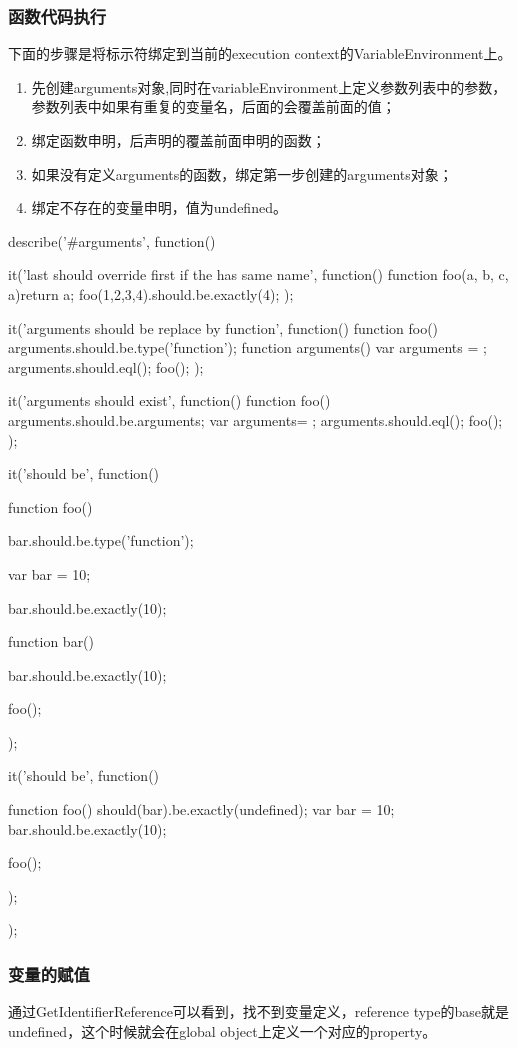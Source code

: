 \subsubsection{函数代码执行}
下面的步骤是将标示符绑定到当前的execution context的VariableEnvironment上。
\begin{enumerate}
\item 先创建arguments对象,同时在variableEnvironment上定义参数列表中的参数，参数列表中如果有重复的变量名，后面的会覆盖前面的值；
\item 绑定函数申明，后声明的覆盖前面申明的函数；
\item 如果没有定义arguments的函数，绑定第一步创建的arguments对象；
\item 绑定不存在的变量申明，值为undefined。
\end{enumerate}

\begin{JavaScript}
	describe('#arguments', function(){
		it('last should override first if the has same name', function(){
			function foo(a, b, c, a){return a;}
			foo(1,2,3,4).should.be.exactly(4);
		});

		it('arguments should be replace by function', function(){
			function foo(){
				arguments.should.be.type('function');
				function arguments(){}
				var arguments = {};
				arguments.should.eql({});
			}
			foo();
		});

		it('arguments should exist', function(){
			function foo(){
				arguments.should.be.arguments;
				var arguments= {};
				arguments.should.eql({});
			}
			foo();
		});

		it('should be', function(){
			function foo(){

				bar.should.be.type('function');

				var bar = 10;

				bar.should.be.exactly(10);

				function bar(){}

				bar.should.be.exactly(10);

			}

			foo();
		});

		it('should be', function(){
			function foo() {
				should(bar).be.exactly(undefined);
				var bar = 10;
				bar.should.be.exactly(10);
			}

			foo();
		});
	});
\end{JavaScript}
\subsubsection{变量的赋值}
通过GetIdentifierReference可以看到，找不到变量定义，reference type的base就是undefined，这个时候就会在global object上定义一个对应的property。

